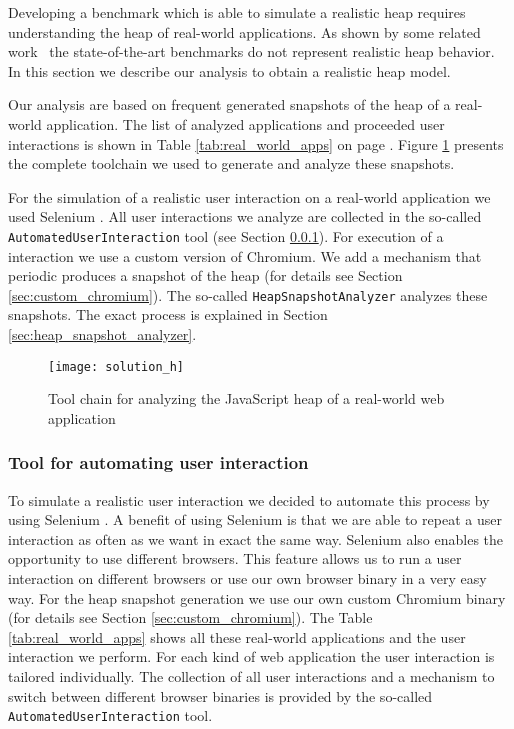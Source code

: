 Developing a benchmark which is able to simulate a realistic \JS heap requires understanding the heap of real-world applications. As shown by some related work~\cite{JSMeter2009,JSMeter2010,Richards2011} the state-of-the-art benchmarks do not represent realistic heap behavior. In this section we describe our analysis to obtain a realistic heap model.

Our analysis are based on frequent generated snapshots of the \JS heap of a real-world application. The list of analyzed applications and proceeded user interactions is shown in Table \ref{tab:real_world_apps} on page \pageref{tab:real_world_apps}.
Figure \ref{fig:heap_structure_analysis} presents the complete toolchain we used to generate and analyze these snapshots. 

For the simulation of a realistic user interaction on a real-world application we used Selenium \cite{Selenium}. All user interactions we analyze are collected in the so-called \texttt{AutomatedUserInteraction} tool (see Section \ref{sec:automated_user_interaction}). For execution of a interaction we use a custom version of Chromium. We add a mechanism that periodic produces a snapshot of the \JS heap (for details see Section \ref{sec:custom_chromium}). 
The so-called \texttt{HeapSnapshotAnalyzer} analyzes these snapshots. The exact process is explained in Section \ref{sec:heap_snapshot_analyzer}.

\begin{figure}
	\centering
	\texttt{[image: solution\_h]}
	\caption{Tool chain for analyzing the JavaScript heap of a real-world web application}
	\label{fig:heap_structure_analysis}
\end{figure}


	
\subsubsection{Tool for automating user interaction} \label{sec:automated_user_interaction}
To simulate a realistic user interaction we decided to automate this process by using Selenium \cite{Selenium}. A benefit of using Selenium is that we are able to repeat a user interaction as often as we want in exact the same way. Selenium also enables the opportunity to use different browsers. This feature allows us to run a user interaction on different browsers or use our own browser binary in a very easy way. For the heap snapshot generation we use our own custom Chromium binary (for details see Section \ref{sec:custom_chromium}). The Table \ref{tab:real_world_apps} shows all these real-world applications and the user interaction we perform. For each kind of web application the user interaction is tailored individually. The collection of all user interactions and a mechanism to switch between different browser binaries is provided by the so-called \texttt{AutomatedUserInteraction} tool.


